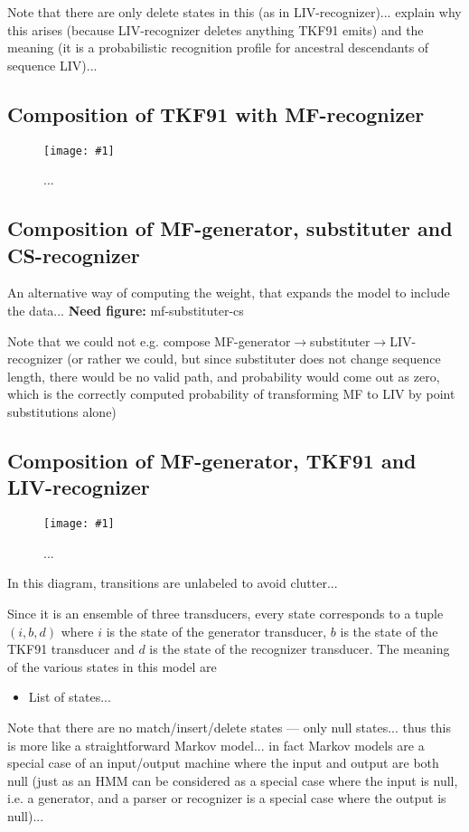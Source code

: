 \documentclass{article}
\newcommand{\figlabel}[1]{\label{Figures.#1}}
\newcommand{\needfig}[1]{{\bf Need figure: } #1 }
\newcommand{\easyfig}[4]{
\begin{figure}
\texttt{[image: \#1]}
\caption{ \figlabel{#3} #4}
\end{figure}}
\newcommand{\widepdffig}[2]{\easyfig{#1-fig.pdf}{width=\textwidth}{#1}{#2}}
\newcommand{\tallpdffig}[2]{\easyfig{#1-fig.pdf}{height=\textheight}{#1}{#2}}
\begin{document}
Note that there are only delete states in this (as in LIV-recognizer)...
explain why this arises (because LIV-recognizer deletes anything TKF91 emits)
and the meaning (it is a probabilistic recognition profile for ancestral descendants of sequence LIV)...

\subsection{Composition of TKF91 with MF-recognizer}

\tallpdffig{tkf91-mf}{...}

\subsection{Composition of MF-generator, substituter and CS-recognizer}

An alternative way of computing the weight, that expands the model to include the data...
\needfig{mf-substituter-cs}

Note that we could not e.g. compose MF-generator$\to$substituter$\to$LIV-recognizer
(or rather we could, but since substituter does not change sequence length,
there would be no valid path, and probability would come out as zero,
which is the correctly computed probability of transforming MF to LIV by point substitutions alone)


\subsection{Composition of MF-generator, TKF91 and LIV-recognizer}

\widepdffig{mf-tkf91-liv}{...}

In this diagram, transitions are unlabeled to avoid clutter...

Since it is an ensemble of three transducers, every state corresponds to a tuple $(i,b,d)$
where
$i$ is the state of the generator transducer,
$b$ is the state of the TKF91 transducer and
$d$ is the state of the recognizer transducer.
The meaning of the various states in this model are
\begin{itemize}
\item List of states...
\end{itemize}

Note that there are no match/insert/delete states --- only null states...
thus this is more like a straightforward Markov model...
in fact Markov models are a special case of an input/output machine where the input and output are both null
(just as an HMM can be considered as a special case where the input is null, i.e. a generator,
and a parser or recognizer is a special case where the output is null)...
\end{document}
